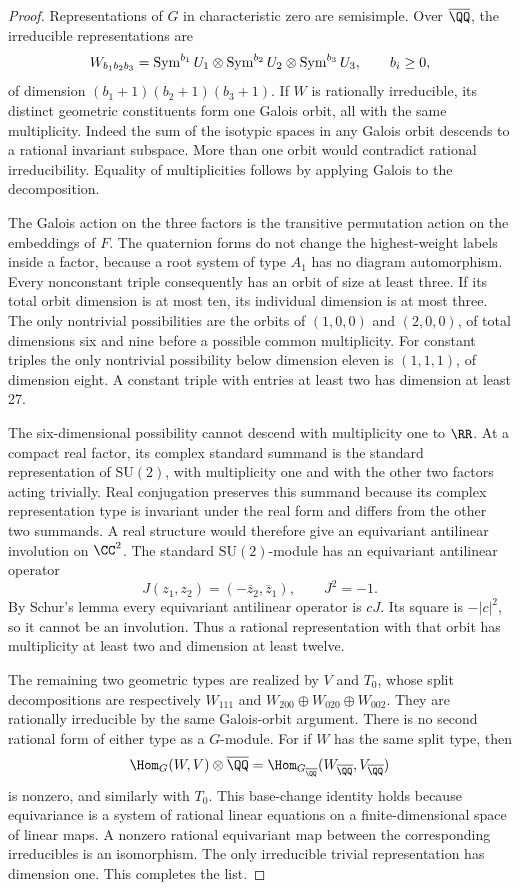 \begin{proof}
Representations of $G$ in characteristic zero are semisimple.
Over $\overline\QQ$, the irreducible representations are
\[
 W_{b_1b_2b_3}
  =\operatorname{Sym}^{b_1}U_1\otimes\operatorname{Sym}^{b_2}U_2\otimes\operatorname{Sym}^{b_3}U_3,
 \qquad b_i\ge0,
\]
of dimension $(b_1+1)(b_2+1)(b_3+1)$.
If $W$ is rationally irreducible, its distinct geometric
constituents form one Galois orbit, all with the same multiplicity.
Indeed the sum of the isotypic spaces in any Galois orbit descends
to a rational invariant subspace. More than one orbit would
contradict rational irreducibility. Equality of multiplicities
follows by applying Galois to the decomposition.

The Galois action on the three factors is the transitive
permutation action on the embeddings of $F$. The quaternion
forms do not change the highest-weight labels inside a factor,
because a root system of type $A_1$ has no diagram automorphism.
Every nonconstant triple consequently has an orbit of size at
least three. If its total orbit dimension is at most ten, its
individual dimension is at most three. The only nontrivial
possibilities are the orbits of $(1,0,0)$ and $(2,0,0)$, of total
dimensions six and nine before a possible common multiplicity.
For constant triples the only nontrivial possibility below
dimension eleven is $(1,1,1)$, of dimension eight. A constant
triple with entries at least two has dimension at least 27.

The six-dimensional possibility cannot descend with multiplicity
one to $\RR$. At a compact real factor, its complex standard
summand is the standard representation of $\mathrm{SU}(2)$,
with multiplicity one and with the other two factors acting
trivially. Real conjugation preserves this summand because its
complex representation type is invariant under the real form
and differs from the other two summands. A real structure would
therefore give an equivariant antilinear involution on
$\CC^2$. The standard $\mathrm{SU}(2)$-module has an
equivariant antilinear operator
\[
 J(z_1,z_2)=(-\overline z_2,\overline z_1),\qquad J^2=-1.
\]
By Schur's lemma every equivariant antilinear operator is $cJ$.
Its square is $-|c|^2$, so it cannot be an involution.
Thus a rational representation with that orbit has multiplicity
at least two and dimension at least twelve.

The remaining two geometric types are realized by $V$ and
$T_0$, whose split decompositions are respectively
$W_{111}$ and $W_{200}\oplus W_{020}\oplus W_{002}$.
They are rationally irreducible by the same Galois-orbit argument.
There is no second rational form of either type as a $G$-module.
For if $W$ has the same split type, then
\[
 \Hom_G(W,V)\otimes\overline\QQ
    =\Hom_{G_{\overline\QQ}}(W_{\overline\QQ},V_{\overline\QQ})
\]
is nonzero, and similarly with $T_0$. This base-change identity
holds because equivariance is a system of rational linear
equations on a finite-dimensional space of linear maps. A
nonzero rational equivariant map between the corresponding
irreducibles is an isomorphism. The only irreducible trivial
representation has dimension one. This completes the list.
\end{proof}


